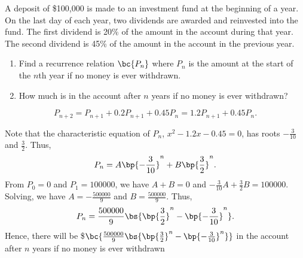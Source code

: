 \begin{problem}
    A deposit of \$100,000 is made to an investment fund at the beginning of a year. On the last day of each year, two dividends are awarded and reinvested into the fund. The first dividend is 20\% of the amount in the account during that year. The second dividend is 45\% of the amount in the account in the previous year.

    \begin{enumerate}
        \item Find a recurrence relation $\bc{P_n}$ where $P_n$ is the amount at the start of the $n$th year if no money is ever withdrawn.
        \item How much is in the account after $n$ years if no money is ever withdrawn?
    \end{enumerate}
\end{problem}
\begin{solution}
    \begin{ppart}
        \[P_{n+2} = P_{n+1} + 0.2 P_{n+1} + 0.45P_n = 1.2 P_{n+1} + 0.45 P_n.\]
    \end{ppart}
    \begin{ppart}
        Note that the characteristic equation of $P_n$, $x^2 - 1.2x - 0.45 = 0$, has roots $-\frac3{10}$ and $\frac32$. Thus, \[P_n = A  \bp{-\frac3{10}}^n + B \bp{\frac32}^n.\] From $P_0 = 0$ and $P_1 = 100000$, we have $A+B = 0$ and $-\frac3{10}A + \frac32B = 100000$. Solving, we have $A = -\frac{500000}{9}$ and $B = \frac{500000}{9}$. Thus, \[P_n = \frac{500000}9 \bs{\bp{\frac32}^n - \bp{-\frac3{10}}^n}.\] Hence, there will be \$$\bc{\frac{500000}9 \bs{\bp{\frac32}^n - \bp{-\frac3{10}}^n}}$ in the account after $n$ years if no money is ever withdrawn
    \end{ppart}
\end{solution}

